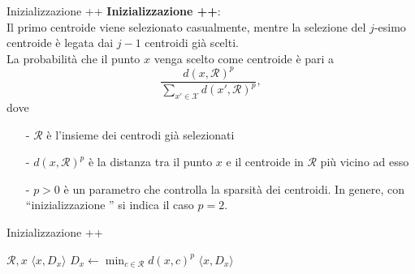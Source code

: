 \documentclass{beamer}
\begin{document}
\begin{frame}{Inizializzazione ++}
    \textbf{Inizializzazione ++}:\\
    Il primo centroide viene selezionato casualmente, mentre la selezione del $j$-esimo centroide è legata dai $j-1$ centroidi già scelti.
    \pause
    \\[.5cm]
    La probabilità che il punto $x$ venga scelto come centroide è pari a 
    \[
        \frac{ d(x,\mathcal{R})^{p}}{\sum_{x' \in \mathcal{X}} d(x',\mathcal{R})^{p}},
    \]
    dove
    \begin{itemize}
        \item[-] $\mathcal{R}$ è l'insieme dei centrodi già selezionati
            \pause
        \item[-] $d(x,\mathcal{R})^{p}$ è la distanza tra il punto $x$ e il centroide in $\mathcal{R}$ più vicino ad esso
            \pause
        \item[-] $p>0$ è un parametro che controlla la sparsità dei centroidi. In genere, con ``inizializzazione \code{++}'' si indica il caso $p=2$.
    \end{itemize}
\end{frame}

\begin{frame}{Inizializzazione ++}
    \begin{algorithm}[H]
        \caption{\textit{Inizializzazione ++ map}}
        \begin{algorithmic}[1]
            \Require $\mathcal{R}, x$
            \Ensure $\langle x, D_x  \rangle $
            \State $D_x \leftarrow \min_{c \in \mathcal{R}} d(x, c)^p$
            \State\Return $\langle x, D_x \rangle $
        \end{algorithmic}
    \end{algorithm}
\end{frame}
\end{document}
